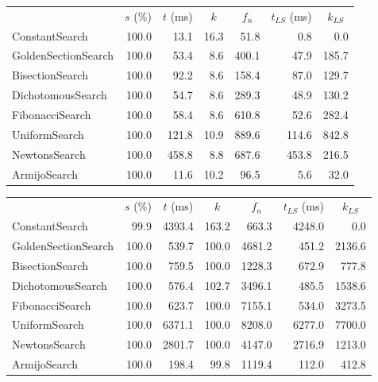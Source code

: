 \documentclass[a4paper,english,titlepage,12pt]{article}
\begin{document}
\begin{center}
\label{tab:performance_results_NE_GDM}
\begin{tabular}{|l|r|r|r|r|r|r|}
\hline
\rowcolor{gray!25}
\multicolumn{1}{|c|}{Line Search Name} & \multicolumn{1}{c|}{$s$ (\%)} & \multicolumn{1}{c|}{$t$ (ms)} & \multicolumn{1}{c|}{$k$} & \multicolumn{1}{c|}{$f_n$} & \multicolumn{1}{c|}{$t_{LS}$ (ms)} & \multicolumn{1}{c|}{$k_{LS}$} \\
ConstantSearch & 100.0 & 13.1 & 16.3 & 51.8 & 0.8 & 0.0 \\
GoldenSectionSearch & 100.0 & 53.4 & 8.6 & 400.1 & 47.9 & 185.7 \\
BisectionSearch & 100.0 & 92.2 & 8.6 & 158.4 & 87.0 & 129.7 \\
DichotomousSearch & 100.0 & 54.7 & 8.6 & 289.3 & 48.9 & 130.2 \\
FibonacciSearch & 100.0 & 58.4 & 8.6 & 610.8 & 52.6 & 282.4 \\
UniformSearch & 100.0 & 121.8 & 10.9 & 889.6 & 114.6 & 842.8 \\
NewtonsSearch & 100.0 & 458.8 & 8.8 & 687.6 & 453.8 & 216.5 \\
ArmijoSearch & 100.0 & 11.6 & 10.2 & 96.5 & 5.6 & 32.0 \\
\hline
\end{tabular}
\end{center}

\begin{center}
\label{tab:performance_results_NE_CGM}
\begin{tabular}{|l|r|r|r|r|r|r|}
\hline
\rowcolor{gray!25}
\multicolumn{1}{|c|}{Line Search Name} & \multicolumn{1}{c|}{$s$ (\%)} & \multicolumn{1}{c|}{$t$ (ms)} & \multicolumn{1}{c|}{$k$} & \multicolumn{1}{c|}{$f_n$} & \multicolumn{1}{c|}{$t_{LS}$ (ms)} & \multicolumn{1}{c|}{$k_{LS}$} \\
ConstantSearch & 99.9 & 4393.4 & 163.2 & 663.3 & 4248.0 & 0.0 \\
GoldenSectionSearch & 100.0 & 539.7 & 100.0 & 4681.2 & 451.2 & 2136.6 \\
BisectionSearch & 100.0 & 759.5 & 100.0 & 1228.3 & 672.9 & 777.8 \\
DichotomousSearch & 100.0 & 576.4 & 102.7 & 3496.1 & 485.5 & 1538.6 \\
FibonacciSearch & 100.0 & 623.7 & 100.0 & 7155.1 & 534.0 & 3273.5 \\
UniformSearch & 100.0 & 6371.1 & 100.0 & 8208.0 & 6277.0 & 7700.0 \\
NewtonsSearch & 100.0 & 2801.7 & 100.0 & 4147.0 & 2716.9 & 1213.0 \\
ArmijoSearch & 100.0 & 198.4 & 99.8 & 1119.4 & 112.0 & 412.8 \\
\hline
\end{tabular}
\end{center}
\end{document}
